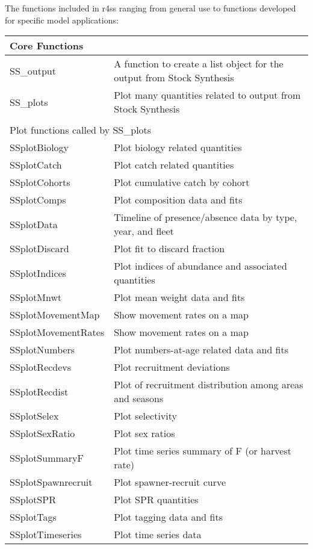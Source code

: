 The functions included in r4ss ranging from general use to functions developed for specific model applications:
\begin{center}
	\begin{longtable}{p{4.5cm} p{10.52cm}}
		Core Functions & \\
		\hline
		SS\_output & A function to create a list object for the output from Stock Synthesis\\
		SS\_plots  & Plot many quantities related to output from Stock Synthesis\\
		\hline
		\\
		\multicolumn{2}{l}{Plot functions called by SS\_plots} \\
		\hline
		SSplotBiology & Plot biology related quantities \\
		SSplotCatch   & Plot catch related quantities \\
		SSplotCohorts & Plot cumulative catch by cohort \\
		SSplotComps   & Plot composition data and fits \\
		SSplotData    & Timeline of presence/absence data by type, year, and fleet \\
		SSplotDiscard & Plot fit to discard fraction \\
		SSplotIndices & Plot indices of abundance and associated quantities \\
		SSplotMnwt    & Plot mean weight data and fits \\
		SSplotMovementMap & Show movement rates on a map \\
		SSplotMovementRates & Show movement rates on a map \\
		SSplotNumbers & Plot numbers-at-age related data and fits \\
		SSplotRecdevs & Plot recruitment deviations \\
		SSplotRecdist & Plot of recruitment distribution among areas and seasons \\
		SSplotSelex   & Plot selectivity \\
		SSplotSexRatio & Plot sex ratios \\
		SSplotSummaryF & Plot time series summary of F (or harvest rate) \\
		SSplotSpawnrecruit & Plot spawner-recruit curve \\
		SSplotSPR     & Plot SPR quantities \\
		SSplotTags    & Plot tagging data and fits \\
		SSplotTimeseries & Plot time series data \\

\end{longtable}
\end{center}

